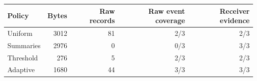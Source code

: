 \begin{tabular}{lrrrr}
\toprule
Policy & Bytes & Raw records & Raw event coverage & Receiver evidence \\
\midrule
Uniform & 3012 & 81 & 2/3 & 2/3 \\
Summaries & 2976 & 0 & 0/3 & 3/3 \\
Threshold & 276 & 5 & 2/3 & 2/3 \\
Adaptive & 1680 & 44 & 3/3 & 3/3 \\
\bottomrule
\end{tabular}
